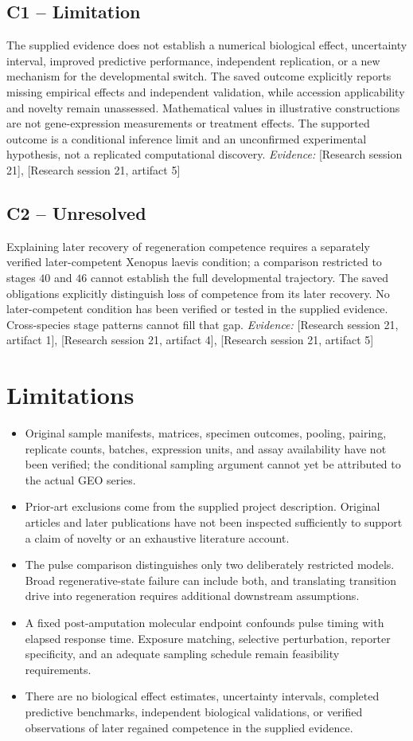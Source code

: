 \documentclass[11pt]{article}
\begin{document}
\subsection{C1 -- Limitation}
The supplied evidence does not establish a numerical biological effect, uncertainty interval, improved predictive performance, independent replication, or a new mechanism for the developmental switch.
The saved outcome explicitly reports missing empirical effects and independent validation, while accession applicability and novelty remain unassessed. Mathematical values in illustrative constructions are not gene-expression measurements or treatment effects. The supported outcome is a conditional inference limit and an unconfirmed experimental hypothesis, not a replicated computational discovery.
\textit{Evidence: }[Research session 21], [Research session 21, artifact 5]
\subsection{C2 -- Unresolved}
Explaining later recovery of regeneration competence requires a separately verified later-competent Xenopus laevis condition; a comparison restricted to stages $40$ and $46$ cannot establish the full developmental trajectory.
The saved obligations explicitly distinguish loss of competence from its later recovery. No later-competent condition has been verified or tested in the supplied evidence. Cross-species stage patterns cannot fill that gap.
\textit{Evidence: }[Research session 21, artifact 1], [Research session 21, artifact 4], [Research session 21, artifact 5]
\section{Limitations}
\begin{itemize}
\item Original sample manifests, matrices, specimen outcomes, pooling, pairing, replicate counts, batches, expression units, and assay availability have not been verified; the conditional sampling argument cannot yet be attributed to the actual GEO series.
\item Prior-art exclusions come from the supplied project description. Original articles and later publications have not been inspected sufficiently to support a claim of novelty or an exhaustive literature account.
\item The pulse comparison distinguishes only two deliberately restricted models. Broad regenerative-state failure can include both, and translating transition drive into regeneration requires additional downstream assumptions.
\item A fixed post-amputation molecular endpoint confounds pulse timing with elapsed response time. Exposure matching, selective perturbation, reporter specificity, and an adequate sampling schedule remain feasibility requirements.
\item There are no biological effect estimates, uncertainty intervals, completed predictive benchmarks, independent biological validations, or verified observations of later regained competence in the supplied evidence.
\end{itemize}
\end{document}
